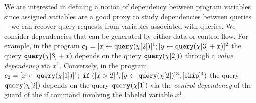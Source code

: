 %
We are interested in defining a notion of dependency between program variables since assigned variables are a good proxy to study dependencies between queries---we can recover query requests from variables associated with queries. We consider dependencies that can be generated by either data or control flow.
For example, in the program 
$c_1 =[\mathrel{ x \leftarrow {\tt query}(\chi[2]) }]^1 ;[\mathrel{ y \leftarrow {\tt query}(\chi[3] + x) }]^2$
the query ${\tt query}(\chi[3] + x)$  depends on the query ${\tt query}(\chi[2]))$ through a \emph{value dependency} via  $x^1$.
Conversely, in the program
$c_2 = [\mathrel{ x \leftarrow {\tt query}(\chi[1]) }]^1 ; \;\mathtt{if}\;( [x > 2]^2 , [\mathrel{ y \leftarrow {\tt query}(\chi[2]) }]^3, [\mathtt{skip}]^4 )$ 
the query ${\tt query}(\chi[2])$  depends on the query ${\tt query}(\chi[1])$ via the \emph{control dependency} of the guard of the if command involving the labeled variable $x^1$.

